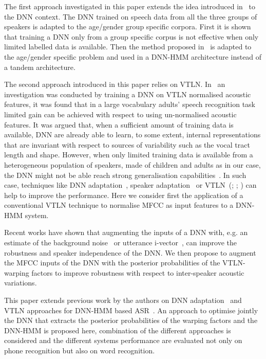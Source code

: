 \documentclass{nle}
\begin{document}
The  first  approach  investigated   in  this  paper  extends  the  idea
introduced in~\citet{YocMor92} to the  DNN context.  The DNN trained on
speech data  from all the three  groups of speakers is  adapted to the
age/gender group specific corpora.  First  it is shown that training a
DNN  only from  a group  specific corpus  is not  effective  when only
limited  labelled  data  is   available.   Then  the  method  proposed
in~\citet{thomas13} is  adapted to the age/gender  specific problem and
used in a DNN-HMM architecture instead of a tandem architecture.

The second approach introduced in this paper relies on VTLN. 
In~\citet{seide11} an  investigation was conducted  by training a
DNN on VTLN normalised acoustic features, it was found that in a large
vocabulary  adults'  speech  recognition  task  limited  gain  can  be
achieved with respect to using un-normalised acoustic features.  It was
argued that, when  a sufficient amount of training  data is available,
DNN   are  already   able  to   learn,  to   some   extent,  internal
representations  that  are  invariant   with  respect  to  sources  of
variability such as  the vocal tract length and  shape.  However, when
only  limited  training  data   is  available  from  a  heterogeneous
population of speakers,  made of children and adults  as in our case,
the   DNN   might   not    be   able   reach   strong   generalisation
capabilities~\citep*{SerGiu2014}.   In such  case,  techniques like  DNN
adaptation~\citep{vietbac10,swietojanski12,thomas13}, speaker
adaptation~\citep*{abdel2013rapid,liao2013speaker} or
VTLN~(\citealp*{EidGis96}; \citealp{LeeRos96}; \citealp*{WegMcaOrlPek96})  can help to  improve the
performance. Here we consider  first the application of a conventional
VTLN technique to normalise MFCC as input features to a DNN-HMM system.

Recent  works have shown  that augmenting  the inputs  of a  DNN with,
e.g.  an  estimate  of  the background  noise~\citep*{export:194344}  or
utterance  i-vector~\citep*{42536},  can   improve  the  robustness  and
speaker independence of  the DNN. We then propose  to augment the MFCC
inputs of the DNN with the posterior probabilities of the VTLN-warping
factors to  improve robustness with respect  to inter-speaker acoustic
variations.

This   paper  extends   previous  work   by  the   authors   on  DNN
adaptation~\citep{SerGiu2014}      and      VTLN     approaches      for
DNN-HMM based ASR~\citep*{SerGiu2014a}.  An approach to  optimise jointly  the DNN
that extracts the posterior probabilities of  the warping factors and the DNN-HMM is
proposed here,  combination of the different  approaches is considered
and the different systems performance  are evaluated not only on phone
recognition but also on word recognition. 
\end{document}
